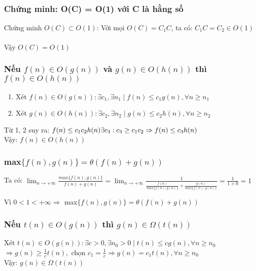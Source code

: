 
\subsection{}
\subsubsection{Chứng minh: O(C) = O(1) với C là hằng số}
Chứng minh $O(C) \subset O(1)$: Với mọi $O(C) = C_1 C$, ta có: $C_1 C = C_2 \in O(1)$\\
\\
Vậy $O(C) = O(1)$
\subsubsection{Nếu $f(n) \in O(g(n))$ và $g(n) \in O(h(n))$ thì $f(n) \in O(h(n))$}
\begin{enumerate}
    \item Xét $f(n) \in O(g(n)): \exists c_1, \exists n_1\mid f(n) \leq c_1 g(n), \forall n\geq n_1$
    \item Xét $g(n) \in O(h(n)): \exists c_2, \exists n_2\mid g(n) \leq c_2 h(n), \forall n\geq n_2$
\end{enumerate}
Từ 1, 2 suy ra: $f(n) \leq c_1 c_2 h(n)\\ \exists c_3: c_3 \geq c_1 c_2 \Rightarrow f(n) \leq c_3 h(n)$\\
Vậy: $f(n) \in O(h(n))$
\subsubsection{max$\{f(n), g(n)\} = \theta(f(n) + g(n))$}
Ta có: $\displaystyle
\lim_{n \to +\infty} \frac{max\{f(n), g(n)\}}{f(n) +g(n)}=\lim_{n \to +\infty} \frac{1}{\frac{f(n)}{max\{f(n), g(n)\}}+\frac{g(n)}{max\{f(n), g(n)\}}}=\frac{1}{1+0}=1 
$

Vì $0<1<+\infty \Rightarrow$ max$\{f(n), g(n)\} = \theta(f(n) + g(n))$
\subsubsection{Nếu $t(n) \in O(g(n))$ thì $g(n) \in \Omega(t(n))$}
Xét $t(n) \in O(g(n)): \exists c > 0, \exists n_0 > 0 \mid t(n) \leq c g(n), \forall n \geq n_0$\\
$\displaystyle \Rightarrow g(n) \geq \frac{1}{c} t(n),$ chọn $\displaystyle c_1 = \frac{1}{c} \Rightarrow g(n) = c_1 t(n), \forall n \geq n_0$\\
Vậy: $g(n) \in \Omega(t(n))$
